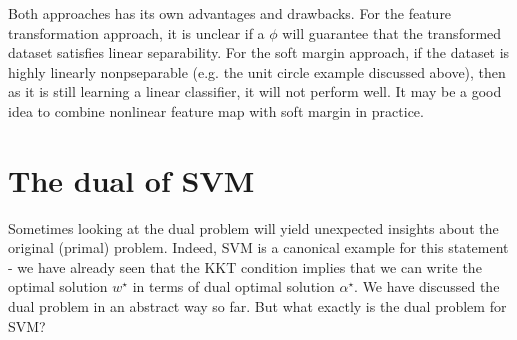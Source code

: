 \documentclass{article}
\begin{document}
Both approaches has its own advantages and drawbacks. For the feature transformation approach, it is unclear if a $\phi$ will guarantee that the transformed dataset satisfies linear separability. For the soft margin approach, if the dataset is highly linearly nonpseparable (e.g. the unit circle example discussed above), then as it is still learning a linear classifier, it will not perform well. It may be a good idea to combine nonlinear feature map with soft margin in practice.

\section{The dual of SVM}
Sometimes looking at the dual problem will yield unexpected insights about the original (primal) problem. Indeed, SVM is a canonical example for this statement - we have already seen that the KKT condition implies that we can write the optimal solution $w^\star$ in terms of dual optimal solution $\alpha^\star$. We have discussed the dual problem in an abstract way so far. But what exactly is the dual problem for SVM?
\end{document}
